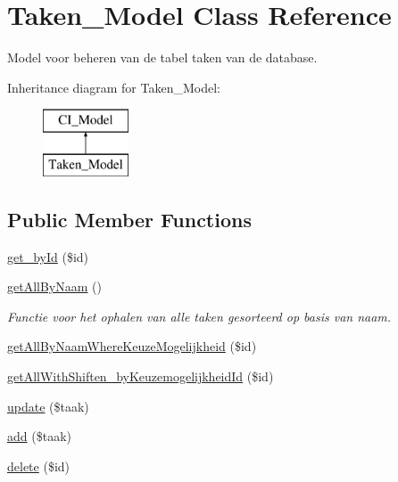 \hypertarget{class_taken___model}{}\section{Taken\+\_\+\+Model Class Reference}
\label{class_taken___model}


Model voor beheren van de tabel taken van de database.  


Inheritance diagram for Taken\+\_\+\+Model\+:\begin{figure}[H]
\begin{center}
\leavevmode
\includegraphics[height=2.000000cm]{class_taken___model}
\end{center}
\end{figure}
\subsection*{Public Member Functions}
\begin{DoxyCompactItemize}
\item 
\mbox{\hyperlink{class_taken___model_ab8c238bca4fc5170294717b94c875cc3}{get\+\_\+by\+Id}} (\$id)
\item 
\mbox{\label{class_taken___model_a5e53ebfe17a0adb72cccb12728f83d6a}} 
\mbox{\hyperlink{class_taken___model_a5e53ebfe17a0adb72cccb12728f83d6a}{get\+All\+By\+Naam}} ()
\begin{DoxyCompactList}\small\item\em Functie voor het ophalen van alle taken gesorteerd op basis van naam. \end{DoxyCompactList}\item 
\mbox{\hyperlink{class_taken___model_aee432ed4b391407df1bf5d8c4973e5fa}{get\+All\+By\+Naam\+Where\+Keuze\+Mogelijkheid}} (\$id)
\item 
\mbox{\hyperlink{class_taken___model_a1b4e18ac99960b20467b3b3cbaa817b4}{get\+All\+With\+Shiften\+\_\+by\+Keuzemogelijkheid\+Id}} (\$id)
\item 
\mbox{\hyperlink{class_taken___model_ab4e93ac196a1aeb83582faa332619c86}{update}} (\$taak)
\item 
\mbox{\hyperlink{class_taken___model_a4ef6e4ab1c71556c29cdc6549e8c888b}{add}} (\$taak)
\item 
\mbox{\hyperlink{class_taken___model_ab00c14e7a0a268dc3f708b45f3bd172b}{delete}} (\$id)
\end{DoxyCompactItemize}


